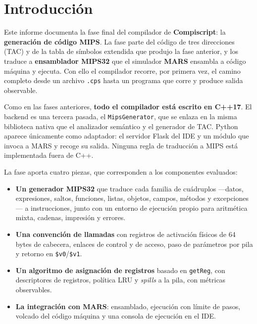 \documentclass[11pt,a4paper]{article}
\begin{document}
\tableofcontents
\newpage

\section{Introducción}

Este informe documenta la fase final del compilador de \textbf{Compiscript}: la
\textbf{generación de código MIPS}. La fase parte del código de tres direcciones
(TAC) y de la tabla de símbolos extendida que produjo la fase anterior, y los
traduce a \textbf{ensamblador MIPS32} que el simulador \textbf{MARS} ensambla a
código máquina y ejecuta. Con ello el compilador recorre, por primera vez, el
camino completo desde un archivo \texttt{.cps} hasta un programa que corre y
produce salida observable.

Como en las fases anteriores, \textbf{todo el compilador está escrito en C++17}.
El backend es una tercera pasada, el \texttt{MipsGenerator}, que se enlaza en la
misma biblioteca nativa que el analizador semántico y el generador de TAC.
Python aparece únicamente como adaptador: el servidor Flask del IDE y un módulo
que invoca a MARS y recoge su salida. Ninguna regla de traducción a MIPS está
implementada fuera de C++.

La fase aporta cuatro piezas, que corresponden a los componentes evaluados:

\begin{itemize}[leftmargin=1.4em]
  \item \textbf{Un generador MIPS32} que traduce cada familia de cuádruplos
        ---datos, expresiones, saltos, funciones, listas, objetos, campos,
        métodos y excepciones--- a instrucciones, junto con un entorno de
        ejecución propio para aritmética mixta, cadenas, impresión y errores.
  \item \textbf{Una convención de llamadas} con registros de activación
        físicos de 64 bytes de cabecera, enlaces de control y de acceso,
        paso de parámetros por pila y retorno en \texttt{\$v0}/\texttt{\$v1}.
  \item \textbf{Un algoritmo de asignación de registros} basado en
        \texttt{getReg}, con descriptores de registros, política LRU y
        \emph{spills} a la pila, con métricas observables.
  \item \textbf{La integración con MARS}: ensamblado, ejecución con límite de
        pasos, volcado del código máquina y una consola de ejecución en el IDE.
\end{itemize}
\end{document}
